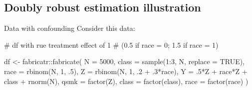\documentclass[
  11pt,
  ignorenonframetext,
]{beamer}
\newenvironment{Shaded}{\begin{snugshade}}{\end{snugshade}}
\newcommand{\AttributeTok}[1]{\textcolor[rgb]{0.40,0.45,0.13}{#1}}
\newcommand{\CommentTok}[1]{\textcolor[rgb]{0.37,0.37,0.37}{#1}}
\newcommand{\ConstantTok}[1]{\textcolor[rgb]{0.56,0.35,0.01}{#1}}
\newcommand{\DecValTok}[1]{\textcolor[rgb]{0.68,0.00,0.00}{#1}}
\newcommand{\FunctionTok}[1]{\textcolor[rgb]{0.28,0.35,0.67}{#1}}
\newcommand{\NormalTok}[1]{\textcolor[rgb]{0.00,0.23,0.31}{#1}}
\newcommand{\OtherTok}[1]{\textcolor[rgb]{0.00,0.23,0.31}{#1}}
\newcommand{\SpecialCharTok}[1]{\textcolor[rgb]{0.37,0.37,0.37}{#1}}
\begin{document}
\hypertarget{doubly-robust-estimation-illustration}{%
\subsection{Doubly robust estimation
illustration}\label{doubly-robust-estimation-illustration}}

\begin{frame}[fragile]{Data with confounding}
\protect\hypertarget{data-with-confounding}{}
Consider this data:

\begin{Shaded}
\begin{Highlighting}[]
\CommentTok{\# df with rue treatment effect of 1 }
\CommentTok{\# (0.5 if race = 0; 1.5 if race = 1)}

\NormalTok{df }\OtherTok{\textless{}{-}}\NormalTok{ fabricatr}\SpecialCharTok{::}\FunctionTok{fabricate}\NormalTok{(}
  \AttributeTok{N =} \DecValTok{5000}\NormalTok{,}
  \AttributeTok{class =} \FunctionTok{sample}\NormalTok{(}\DecValTok{1}\SpecialCharTok{:}\DecValTok{3}\NormalTok{, N, }\AttributeTok{replace =} \ConstantTok{TRUE}\NormalTok{),}
  \AttributeTok{race =} \FunctionTok{rbinom}\NormalTok{(N, }\DecValTok{1}\NormalTok{, .}\DecValTok{5}\NormalTok{),}
  \AttributeTok{Z =} \FunctionTok{rbinom}\NormalTok{(N, }\DecValTok{1}\NormalTok{, .}\DecValTok{2} \SpecialCharTok{+}\NormalTok{ .}\DecValTok{3}\SpecialCharTok{*}\NormalTok{race),}
  \AttributeTok{Y =}\NormalTok{ .}\DecValTok{5}\SpecialCharTok{*}\NormalTok{Z }\SpecialCharTok{+}\NormalTok{ race}\SpecialCharTok{*}\NormalTok{Z }\SpecialCharTok{+}\NormalTok{ class }\SpecialCharTok{+} \FunctionTok{rnorm}\NormalTok{(N),}
  \AttributeTok{qsmk =} \FunctionTok{factor}\NormalTok{(Z),}
  \AttributeTok{class =} \FunctionTok{factor}\NormalTok{(class),}
  \AttributeTok{race =} \FunctionTok{factor}\NormalTok{(race)}
\NormalTok{)}
\end{Highlighting}
\end{Shaded}
\end{frame}
\end{document}
